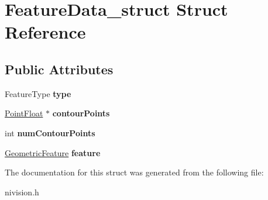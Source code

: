 \hypertarget{structFeatureData__struct}{
\section{FeatureData\_\-struct Struct Reference}
\label{structFeatureData__struct}
}
\subsection*{Public Attributes}
\begin{DoxyCompactItemize}
\item 
\hypertarget{structFeatureData__struct_a6476e22e6176ad13876910ada2513702}{
FeatureType {\bfseries type}}
\label{structFeatureData__struct_a6476e22e6176ad13876910ada2513702}

\item 
\hypertarget{structFeatureData__struct_aecde9a8aec6977141140e4954b513f08}{
\hyperlink{structPointFloat__struct}{PointFloat} $\ast$ {\bfseries contourPoints}}
\label{structFeatureData__struct_aecde9a8aec6977141140e4954b513f08}

\item 
\hypertarget{structFeatureData__struct_a330e409103f7856a38b37ff087fa7745}{
int {\bfseries numContourPoints}}
\label{structFeatureData__struct_a330e409103f7856a38b37ff087fa7745}

\item 
\hypertarget{structFeatureData__struct_a39062daf726ef1dbd7cea9fb6328e0c8}{
\hyperlink{unionGeometricFeature__union}{GeometricFeature} {\bfseries feature}}
\label{structFeatureData__struct_a39062daf726ef1dbd7cea9fb6328e0c8}

\end{DoxyCompactItemize}


The documentation for this struct was generated from the following file:\begin{DoxyCompactItemize}
\item 
nivision.h\end{DoxyCompactItemize}
